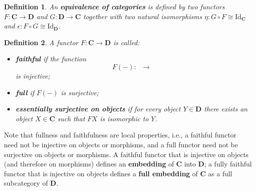 \documentclass[a5paper,oneside,11pt]{article}
\newtheorem{defn}{Definition}
\newcommand\Id{\mathord{\mathrm{Id}}}
\newcommand\1{\mathord{\mathrm{1}}}
\newcommand\cat[1]{\mathbf{#1}}
\newcommand\Hom[3]{\mathop{\mathsf{Hom}_{\cat{#1}}(#2, #3)}}
\begin{document}
\begin{defn}
    \label{defn:cateq}
    An \textbf{equivalence of categories} is defined by two functors
    $F : \cat{C} \longrightarrow \cat{D}$ and $G : \cat{D} \longrightarrow \cat{C}$
    together with two natural isomorphisms $\eta : G \circ F \cong \Id_\cat{C}$ and
    $\epsilon : F \circ G \cong \Id_\cat{D}$.
\end{defn}

\begin{defn}
    \label{defn:funcprops}
    A functor $F : \cat{C} \longrightarrow \cat{D}$ is called:
    \begin{itemize}
        \item \textbf{faithful} if the function
            $$F(-) : \Hom{C}{X}{Y} \rightarrow \Hom{D}{FX}{FY}$$ is injective;
        \item \textbf{full} if $F(-)$ is surjective;
        \item \textbf{essentially surjective on objects} if for every object
            $Y \in \cat{D}$ there exists an object $X \in \cat{C}$ such that
            $FX$ is isomorphic to $Y$.
    \end{itemize}
\end{defn}
Note that fullness and faithfulness are local properties, i.e.,
a faithful functor need not be injective on objects or morphisms,
and a full functor need not be surjective on objects or morphisms.
A faithful functor that is injective on objects (and therefore on morphisms)
defines an \textbf{embedding} of $\cat{C}$ into $\cat{D}$; a fully faithful functor
that is injective on objects defines a \textbf{full embedding} of $\cat{C}$ as a
full subcategory of $\cat{D}$.
\end{document}
